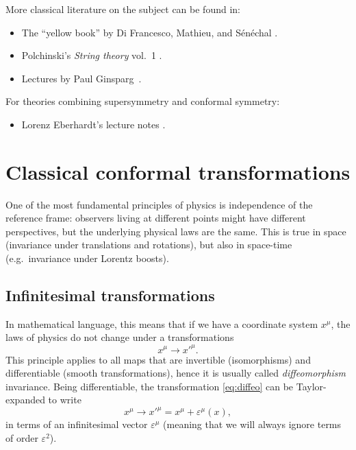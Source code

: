 \documentclass[a4paper,12pt]{article}
\numberwithin{equation}{section}
\begin{document}
More classical literature on the subject can be found in:
\begin{itemize}

\item
The ``yellow book'' by Di Francesco, Mathieu, and Sénéchal
\cite{DiFrancesco:1997nk}.

\item
Polchinski's \emph{String theory} vol.~1
\cite{Polchinski:1998rq}.

\item
Lectures by Paul Ginsparg~\cite{Ginsparg:1988ui}.

\end{itemize}
%
For theories combining supersymmetry and conformal symmetry:
\begin{itemize}

\item
Lorenz Eberhardt's lecture notes 
\cite{Eberhardt:2020cxo}.

\end{itemize}


\section{Classical conformal transformations}
\label{sec:classical}

One of the most fundamental principles of physics is independence of the reference frame: observers living at different points might have different perspectives, but the underlying physical laws are the same.
This is true in space (invariance under translations and rotations), but also in space-time (e.g.~invariance under Lorentz boosts).

\subsection{Infinitesimal transformations}

In mathematical language, this means that if we have a coordinate system $x^\mu$, the laws of physics do not change under a transformations 
\begin{equation}
	x^\mu \to x'^\mu.
	\label{eq:diffeo}
\end{equation}
This principle applies to all maps that are invertible (isomorphisms) and differentiable (smooth transformations), hence it is usually called \emph{diffeomorphism} invariance.
Being differentiable, the transformation \eqref{eq:diffeo} can be Taylor-expanded to write
\begin{equation}
	x^\mu \to x'^\mu = x^\mu + \varepsilon^\mu(x),
	\label{eq:diffeo:infinitesimal}
\end{equation}
in terms of an infinitesimal vector $\varepsilon^\mu$ (meaning that we will always ignore terms of order $\varepsilon^2$).
\end{document}
